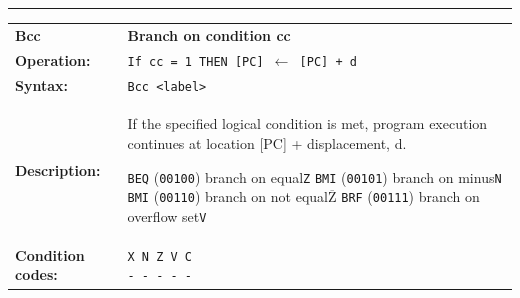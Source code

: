\documentclass[]{article}
\newcommand{\textoverline}[1]{$\overline{\mbox{#1}}$}
\begin{document}
\begin{appendices}
\noindent\rule{\textwidth}{1pt}\newline %
\setlength\extrarowheight{5pt} %
\begin{tabularx}{\textwidth}{lL}
  {\Large \textbf{Bcc}} 	& {\Large \textbf{Branch on condition cc}}\\
  \textbf{Operation:} 		& \texttt{If cc = 1 THEN [PC] $\leftarrow$ [PC] + d}\\
  \textbf{Syntax:}  		& \texttt{Bcc <label>}\\
  \textbf{Description:}  	& If the specified logical condition is met, program execution
continues at location [PC] + displacement, d.\newline

\texttt{BEQ} (\texttt{00100}) {} {} branch on equal\hfill \texttt{Z}\newline
\texttt{BMI} (\texttt{00101}) {} {} branch on minus\hfill \texttt{N}\newline
\texttt{BMI} (\texttt{00110}) {} {} branch on not equal\hfill \texttt{\textoverline{Z}}\newline
\texttt{BRF} (\texttt{00111}) {} {} branch on overflow set\hfill \texttt{V}\newline
							  \\
  \textbf{Condition codes:} & \texttt{X N Z V C\newline - - - - -}\\
\end{tabularx}
\newline

\newpage


\end{appendices}
\end{document}
